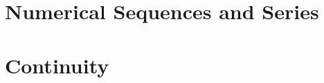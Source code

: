 \documentclass[
]{book}
\theoremstyle{definition}
\theoremstyle{definition}
\theoremstyle{definition}
\theoremstyle{definition}
\theoremstyle{remark}
\begin{document}
\chapter{Numerical Sequences and Series}\label{numerical-sequences-and-series}

\chapter{Continuity}\label{continuity}

  
\end{document}
